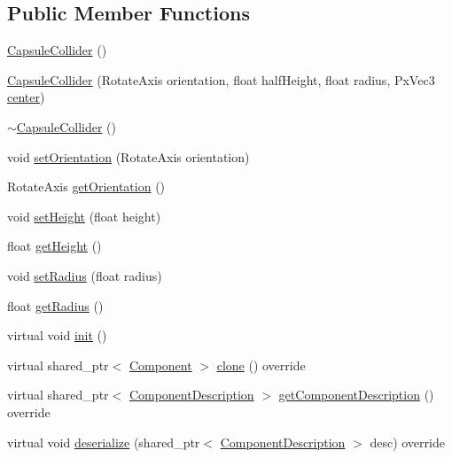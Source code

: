 \subsection*{Public Member Functions}
\begin{DoxyCompactItemize}
\item 
\hyperlink{class_capsule_collider_a2f3f343173ed386673b045f8963246b0}{Capsule\+Collider} ()
\item 
\hyperlink{class_capsule_collider_a4d63d957812a224d7c476c75e76fd16f}{Capsule\+Collider} (Rotate\+Axis orientation, float half\+Height, float radius, Px\+Vec3 \hyperlink{class_collider_a42b57aa35ab665daf89ae844e479c560}{center})
\item 
\hyperlink{class_capsule_collider_ad0ea124fada29b0f3390cddb66b828a8}{$\sim$\+Capsule\+Collider} ()
\item 
void \hyperlink{class_capsule_collider_afeedbe30ba1eb78d1b8b1f0162f684d7}{set\+Orientation} (Rotate\+Axis orientation)
\item 
Rotate\+Axis \hyperlink{class_capsule_collider_a0c5a68adf4fab424ab878778dd6e4f9b}{get\+Orientation} ()
\item 
void \hyperlink{class_capsule_collider_a6304f7dea81fbb45a518e5052381d511}{set\+Height} (float height)
\item 
float \hyperlink{class_capsule_collider_a406bcbd57d22e9f6ad1626d2f4264a65}{get\+Height} ()
\item 
void \hyperlink{class_capsule_collider_aef1729d1b992406ab5daedfc7d03be9a}{set\+Radius} (float radius)
\item 
float \hyperlink{class_capsule_collider_a9e9013e8280c361033bf774dfea6d4e9}{get\+Radius} ()
\item 
virtual void \hyperlink{class_capsule_collider_a725516c53e2ac8eeee318107dc888163}{init} ()
\item 
virtual shared\+\_\+ptr$<$ \hyperlink{class_component}{Component} $>$ \hyperlink{class_capsule_collider_a6ee91020e9118a97f9d5960b088b7db7}{clone} () override
\item 
virtual shared\+\_\+ptr$<$ \hyperlink{class_component_description}{Component\+Description} $>$ \hyperlink{group__serialization__functions_ga9dc5198cfc2de557ac56210cce1dce82}{get\+Component\+Description} () override
\item 
virtual void \hyperlink{group__serialization__functions_ga6bd7fb4ea4628b29528aaf28d78ff325}{deserialize} (shared\+\_\+ptr$<$ \hyperlink{class_component_description}{Component\+Description} $>$ desc) override
\end{DoxyCompactItemize}
